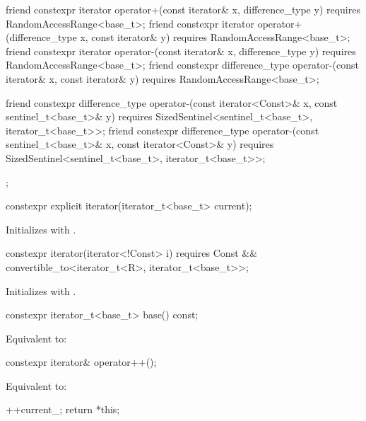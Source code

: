 \begin{codeblock}
{{    friend constexpr iterator operator+(const iterator& x, difference_type y)
      requires RandomAccessRange<base_t>;
    friend constexpr iterator operator+(difference_type x, const iterator& y)
      requires RandomAccessRange<base_t>;
    friend constexpr iterator operator-(const iterator& x, difference_type y)
      requires RandomAccessRange<base_t>;
    friend constexpr difference_type operator-(const iterator& x, const iterator& y)
      requires RandomAccessRange<base_t>;

    friend constexpr difference_type
      operator-(const iterator<Const>& x, const sentinel_t<base_t>& y)
        requires SizedSentinel<sentinel_t<base_t>, iterator_t<base_t>>;
    friend constexpr difference_type
      operator-(const sentinel_t<base_t>& x, const iterator<Const>& y)
        requires SizedSentinel<sentinel_t<base_t>, iterator_t<base_t>>;
  };
}
\end{codeblock}

\begin{itemdecl}
constexpr explicit iterator(iterator_t<base_t> current);
\end{itemdecl}

\begin{itemdescr}
\pnum
\effects
Initializes  with .
\end{itemdescr}

\begin{itemdecl}
constexpr iterator(iterator<!Const> i)
  requires Const && convertible_to<iterator_t<R>, iterator_t<base_t>>;
\end{itemdecl}

\begin{itemdescr}
\pnum
\effects
Initializes  with .
\end{itemdescr}

\begin{itemdecl}
constexpr iterator_t<base_t> base() const;
\end{itemdecl}

\begin{itemdescr}
\pnum
\effects
Equivalent to: 
\end{itemdescr}

\begin{itemdecl}
constexpr iterator& operator++();
\end{itemdecl}

\begin{itemdescr}
\pnum
\effects Equivalent to:
\begin{codeblock}
++current_;
return *this;
\end{codeblock}
\end{itemdescr}

